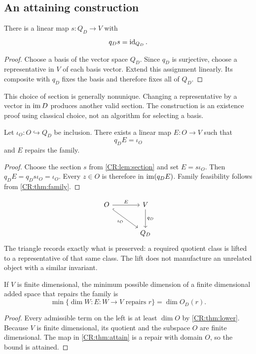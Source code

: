 \subsection{An attaining construction}
\begin{CRlemma}\label{CR:lem:section}
There is a linear map $s:Q_D\to V$ with
\[
q_Ds=\operatorname{id}_{Q_D}.
\]
\end{CRlemma}
\begin{proof}
Choose a basis of the vector space $Q_D$. Since $q_D$ is surjective, choose a representative in $V$ of each basis vector. Extend this assignment linearly. Its composite with $q_D$ fixes the basis and therefore fixes all of $Q_D$.
\end{proof}

This choice of section is generally nonunique. Changing a representative by a vector in $\operatorname{im} D$ produces another valid section. The construction is an existence proof using classical choice, not an algorithm for selecting a basis.

\begin{CRtheorem}\label{CR:thm:attain}
Let $\iota_O:O\hookrightarrow Q_D$ be inclusion. There exists a linear map $E:O\to V$ such that
\begin{equation}\label{CR:eq:section-on-O}
q_DE=\iota_O
\end{equation}
and $E$ repairs the family.
\end{CRtheorem}
\begin{proof}
Choose the section $s$ from \cref{CR:lem:section} and set $E=s\iota_O$. Then $q_DE=q_Ds\iota_O=\iota_O$. Every $z\in O$ is therefore in $\operatorname{im}(q_DE)$. Family feasibility follows from \cref{CR:thm:family}.
\end{proof}

\[
\begin{tikzcd}[column sep=large,row sep=large]
O \arrow[r,"E"] \arrow[dr,hook,"\iota_O"'] & V \arrow[d,"q_D"]\\
& Q_D
\end{tikzcd}
\]
The triangle records exactly what is preserved: a required quotient class is lifted to a representative of that same class. The lift does not manufacture an unrelated object with a similar invariant.

\begin{CRtheorem}\label{CR:thm:minimum}
If $V$ is finite dimensional, the minimum possible dimension of a finite dimensional added space that repairs the family is
\begin{equation}\label{CR:eq:minimum}
\min\bigl\{\dim W: E:W\to V\text{ repairs }r\bigr\}=\dim O_D(r).
\end{equation}
\end{CRtheorem}
\begin{proof}
Every admissible term on the left is at least $\dim O$ by \cref{CR:thm:lower}. Because $V$ is finite dimensional, its quotient and the subspace $O$ are finite dimensional. The map in \cref{CR:thm:attain} is a repair with domain $O$, so the bound is attained.
\end{proof}

